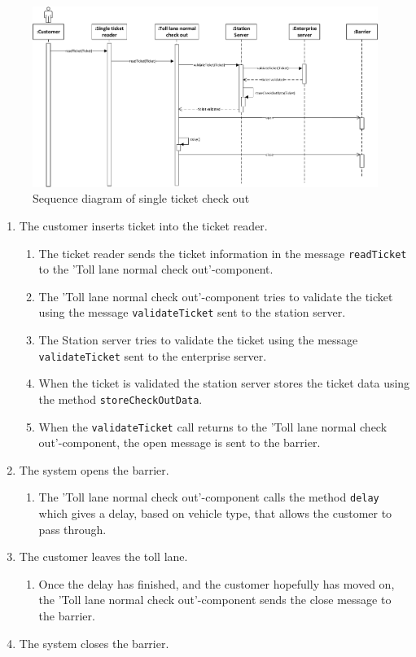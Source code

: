 \begin{figure}[H]
\centering
\includegraphics[width=1.4\columnwidth]{img/sequence_diagrams/sequence_diagram_single_ticket_check_out}
\caption[fig1]{Sequence diagram of single ticket check out}
\label{fig:seq_check_out_single_ticket}
\end{figure}

\begin{enumerate}
\item The customer inserts ticket into the ticket reader.
\begin{enumerate}
\item The ticket reader sends the ticket information in the message \texttt{readTicket} to the 'Toll lane normal check out'-component.
\item The 'Toll lane normal check out'-component tries to validate the ticket using the message \texttt{validateTicket} sent to the station server.
\item The Station server tries to validate the ticket using the message \texttt{validateTicket} sent to the enterprise server.
\item When the ticket is validated the station server stores the ticket data using the method \texttt{storeCheckOutData}.
\item When the \texttt{validateTicket} call returns to the 'Toll lane normal check out'-component, the open message is sent to the barrier.
\end{enumerate}
\item The system opens the  barrier.
\begin{enumerate}
\item The 'Toll lane normal check out'-component calls the method \texttt{delay} which gives a delay, based on vehicle type, that allows the customer to pass through.
\end{enumerate}
\item The customer leaves the toll lane.
\begin{enumerate}
\item Once the delay has finished, and the customer hopefully has moved on, the 'Toll lane normal check out'-component sends the close message to the barrier.
\end{enumerate}
\item The system closes the barrier.

\end{enumerate}

